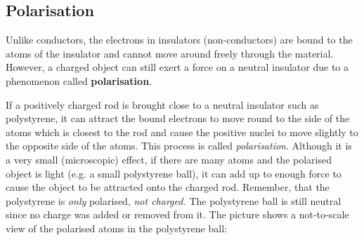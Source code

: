       \subsection*{Polarisation}
            \nopagebreak
            \label{m38780*id201876}Unlike conductors, the electrons in insulators (non-conductors) are bound to the atoms of the
insulator and cannot move around freely through the material. However, a charged object can still
exert a force on a neutral insulator due to a phenomenon called \textbf{polarisation}.\par 
        \label{m38780*id201887}If a positively charged rod is
brought close to a neutral insulator such as polystyrene, it can attract the bound electrons
to move round to the
side of the atoms which is closest to the rod and cause the positive nuclei to move slightly
to the opposite side of the atoms. This process is called \textsl{polarisation}. Although
it is a very small (microscopic) effect, if there are many atoms and the polarised object is
light (e.g.\@{} a small polystyrene ball), it can add up to enough force to cause the object to be attracted onto the
charged rod. Remember, that the polystyrene
is \textsl{only} polarised, \textsl{not charged.}
The polystyrene ball is still neutral since no charge was added or removed from it.
The picture shows
a not-to-scale view of the polarised atoms in the polystyrene ball:\par 
        \label{m38780*id201914}
    \setcounter{subfigure}{0}

